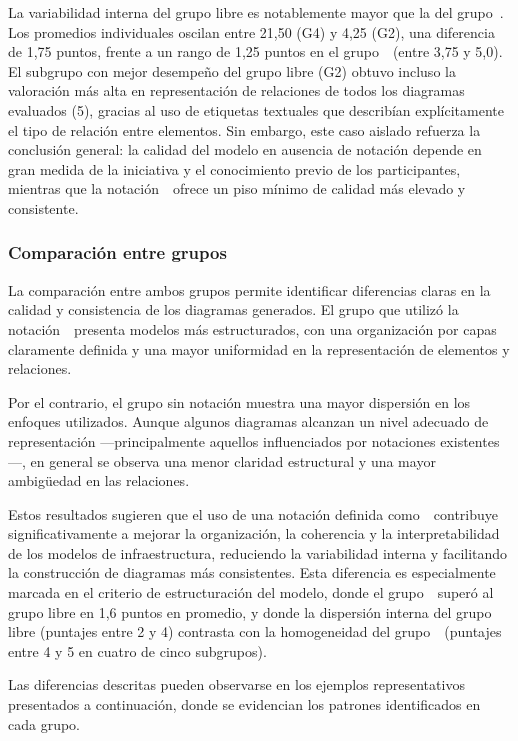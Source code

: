 La variabilidad interna del grupo libre es notablemente mayor que la del grupo~\NDITI. Los promedios individuales oscilan entre 21,50 (G4) y 4,25 (G2), una diferencia de 1,75 puntos, frente a un rango de 1,25 puntos en el grupo~\NDITI~(entre 3,75 y 5,0). El subgrupo con mejor desempeño del grupo libre (G2) obtuvo incluso la valoración más alta en representación de relaciones de todos los diagramas evaluados (5), gracias al uso de etiquetas textuales que describían explícitamente el tipo de relación entre elementos. Sin embargo, este caso aislado refuerza la conclusión general: la calidad del modelo en ausencia de notación depende en gran medida de la iniciativa y el conocimiento previo de los participantes, mientras que la notación~\NDITI~ofrece un piso mínimo de calidad más elevado y consistente.

\subsubsection{Comparación entre grupos}
\noindent
La comparación entre ambos grupos permite identificar diferencias claras en la calidad y consistencia de los diagramas generados. El grupo que utilizó la notación~\NDITI~presenta modelos más estructurados, con una organización por capas claramente definida y una mayor uniformidad en la representación de elementos y relaciones.

Por el contrario, el grupo sin notación muestra una mayor dispersión en los enfoques utilizados. Aunque algunos diagramas alcanzan un nivel adecuado de representación —principalmente aquellos influenciados por notaciones existentes—, en general se observa una menor claridad estructural y una mayor ambigüedad en las relaciones.

\noindent
Estos resultados sugieren que el uso de una notación definida como~\NDITI~contribuye significativamente a mejorar la organización, la coherencia y la interpretabilidad de los modelos de infraestructura, reduciendo la variabilidad interna y facilitando la construcción de diagramas más consistentes. Esta diferencia es especialmente marcada en el criterio de estructuración del modelo, donde el grupo~\NDITI~superó al grupo libre en 1,6 puntos en promedio, y donde la dispersión interna del grupo libre (puntajes entre 2 y 4) contrasta con la homogeneidad del grupo~\NDITI~(puntajes entre 4 y 5 en cuatro de cinco subgrupos).

\noindent
Las diferencias descritas pueden observarse en los ejemplos representativos presentados a continuación, donde se evidencian los patrones identificados en cada grupo.

